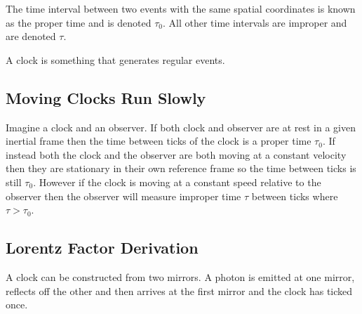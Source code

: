 \documentclass{article}
\begin{document}
    The time interval between two events with the same spatial coordinates is known as the proper time and is denoted \(\tau_0\). All other time intervals are improper and are denoted \(\tau\).
    
    A clock is something that generates regular events.
    
    \subsection{Moving Clocks Run Slowly}
    Imagine a clock and an observer. 
    If both clock and observer are at rest in a given inertial frame then the time between ticks of the clock is a proper time \(\tau_0\). 
    If instead both the clock and the observer are both moving at a constant velocity then they are stationary in their own reference frame so the time between ticks is still \(\tau_0\).
    However if the clock is moving at a constant speed relative to the observer then the observer will measure improper time \(\tau\) between ticks where \(\tau>\tau_0\).
    
    \subsection{Lorentz Factor Derivation}
    A clock can be constructed from two mirrors. 
    A photon is emitted at one mirror, reflects off the other and then arrives at the first mirror and the clock has ticked once.
    
\end{document}
